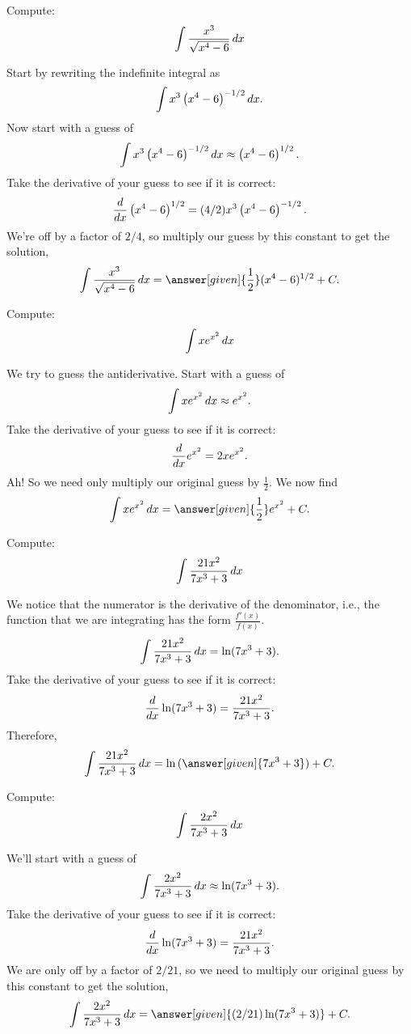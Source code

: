 \documentclass{ximera}
\begin{document}
\begin{example}
  Compute:
  \[
  \int \frac{x^3}{\sqrt{x^4 -6}} \mathop{}\!d x
  \]
  \begin{explanation}
    Start by rewriting the indefinite integral as
    \[
    \int x^3\left(x^4 -6\right)^{-1/2} \mathop{}\!d x.
    \]
    Now start with a guess of
    \[
    \int x^3\left(x^4 -6\right)^{-1/2} \mathop{}\!d x \approx \left(x^4 -6\right)^{1/2}.
    \]
    Take the derivative of your guess to see if it is correct:
    \[
    \frac{d}{\mathop{}\!d x}  \left(x^4 -6\right)^{1/2} = (4/2)x^3\left(x^4 -6\right)^{-1/2}.
    \]
    We're off by a factor of $2/4$, so multiply our guess by this constant
    to get the solution,
    \[
    \int \frac{x^3}{\sqrt{x^4 -6}} \d x = \answer[given]{\frac{1}{2}}(x^4 -6)^{1/2}+C.
    \]
\end{explanation}
\end{example}

\begin{example}
Compute:
\[
\int xe^{x^2} \mathop{}\!d x
\]
\begin{explanation}
We try to guess the antiderivative. Start with a guess of
\[
\int xe^{x^2} \mathop{}\!d x \approx e^{x^2}.
\]
Take the derivative of your guess to see if it is correct:
\[
\frac{d}{\mathop{}\!d x} e^{x^2} = 2xe^{x^2} .
\]
Ah! So we need only multiply our original guess by $\frac{1}{2}$.  We now
find
\[
\int xe^{x^2} \d x =\answer[given]{\frac{1}{2}}e^{x^2} + C.
\]
\end{explanation}
\end{example}
\begin{example}
Compute:
\[
\int \frac{21x^2}{7x^3 + 3} \mathop{}\!d x
\]
\begin{explanation}
We notice that the numerator is the derivative of the denominator, i.e., the function that we are integrating has the form $\frac{f'(x)}{f(x)}$.
\[
\int \frac{21x^2}{7x^3 + 3} \mathop{}\!d x = \ln(7x^3+3).
\]
Take the derivative of your guess to see if it is correct:
\[
\frac{d}{\mathop{}\!d x} \ln(7x^3+3) = \frac{21x^2}{7x^3 + 3}.
\]
Therefore,
\[
\int \frac{21x^2}{7x^3 + 3} \d x = \ln{(\answer[given]{7x^3+3})}+C.
\]
\end{explanation}
\end{example}
\begin{example}
Compute:
\[
\int \frac{2x^2}{7x^3 + 3} \mathop{}\!d x
\]
\begin{explanation}
We'll start with a guess of
\[
\int \frac{2x^2}{7x^3 + 3} \mathop{}\!d x \approx \ln(7x^3+3).
\]
Take the derivative of your guess to see if it is correct:
\[
\frac{d}{\mathop{}\!d x} \ln(7x^3+3) = \frac{21x^2}{7x^3 + 3}.
\]
We are only off by a factor of $2/21$, so we need to multiply our
original guess by this constant to get the solution,
\[
\int \frac{2x^2}{7x^3 + 3} \d x = \answer[given]{(2/21)\ln(7x^3+3)}+C.
\]
\end{explanation}
\end{example}
\end{document}
